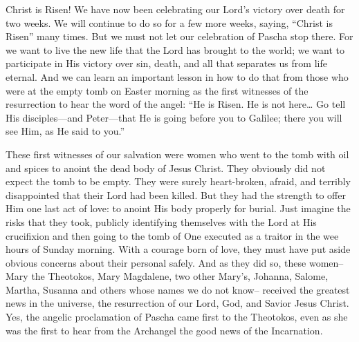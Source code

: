 \documentclass[twoside, letterpaper, 12pt]{report}
\begin{document}
\begin{maybetwocolumns}

Christ is Risen! We have now been celebrating our Lord’s victory over death for two
weeks. We will continue to do so for a few more weeks, saying, “Christ is Risen” many times.
But we must not let our celebration of Pascha stop there. For we want to live the new life that the
Lord has brought to the world; we want to participate in His victory over sin, death, and all that
separates us from life eternal. And we can learn an important lesson in how to do that from those
who were at the empty tomb on Easter morning as the first witnesses of the resurrection to hear
the word of the angel: “He is Risen. He is not here… Go tell His disciples—and Peter—that He
is going before you to Galilee; there you will see Him, as He said to you.”

These first witnesses of our salvation were women who went to the tomb with oil and spices to
anoint the dead body of Jesus Christ. They obviously did not expect the tomb to be empty. They
were surely heart-broken, afraid, and terribly disappointed that their Lord had been killed. But
they had the strength to offer Him one last act of love: to anoint His body properly for burial. Just
imagine the risks that they took, publicly identifying themselves with the Lord at His crucifixion
and then going to the tomb of One executed as a traitor in the wee hours of Sunday morning. With
a courage born of love, they must have put aside obvious concerns about their personal safely. And
as they did so, these women– Mary the Theotokos, Mary Magdalene, two other Mary’s, Johanna,
Salome, Martha, Susanna and others whose names we do not know– received the greatest news
in the universe, the resurrection of our Lord, God, and Savior Jesus Christ. Yes, the angelic
proclamation of Pascha came first to the Theotokos, even as she was the first to hear from the
Archangel the good news of the Incarnation.


\end{maybetwocolumns}
\end{document}
